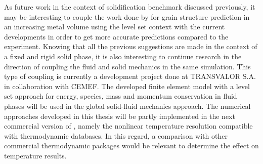 \newline
As future work in the context of solidification benchmark discussed previously, it may be interesting to 
couple the work done by \citet{chen_3d_2014} for grain structure prediction
in an increasing metal volume using the level set context with the current developments in order to get more
accurate predictions compared to the experiment. Knowing that all the previous suggestions are made in the context
of a fixed and rigid solid phase, it is also interesting to continue research in the direction of coupling the
fluid and solid mechanics in the same simulation.
This type of coupling is currently a development project done at TRANSVALOR S.A. in collaboration with CEMEF.
The developed finite element model with a level set approach for energy, species, mass and momentum conservation
in fluid phases will be used in the global solid-fluid mechanics approach.
The numerical approaches developed in this thesis will be partly implemented in the next commercial version
of \thercast, namely the nonlinear temperature resolution compatible with thermodynamic databases. In this regard,
a comparison with other commercial thermodynamic packages would be relevant to determine the effect on temperature results.